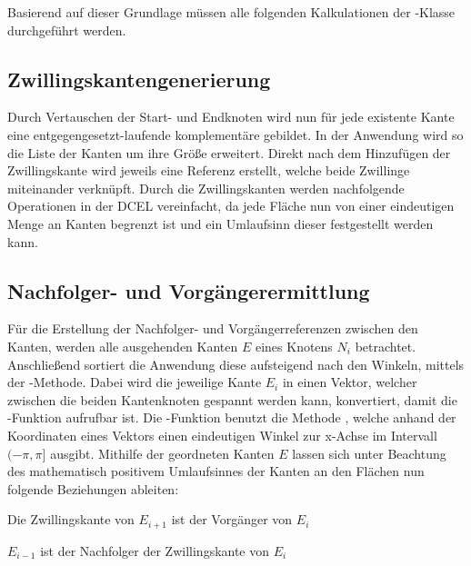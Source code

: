 Basierend auf dieser Grundlage müssen alle folgenden Kalkulationen der -Klasse durchgeführt werden.

\subsection{Zwillingskantengenerierung}
Durch Vertauschen der Start- und Endknoten wird nun für jede existente Kante eine entgegengesetzt-laufende komplementäre  gebildet.
In der Anwendung wird so die Liste der Kanten um ihre Größe erweitert.
Direkt nach dem Hinzufügen der Zwillingskante wird jeweils eine Referenz erstellt, welche beide Zwillinge miteinander verknüpft. 
Durch die Zwillingskanten werden nachfolgende Operationen in der DCEL vereinfacht, da jede Fläche nun von einer eindeutigen Menge an Kanten begrenzt ist und ein Umlaufsinn dieser festgestellt werden kann.

\subsection{Nachfolger- und Vorgängerermittlung}
Für die Erstellung der Nachfolger- und Vorgängerreferenzen zwischen den Kanten, werden alle ausgehenden Kanten $E$ eines Knotens $N_i$ betrachtet.
Anschließend sortiert die Anwendung diese aufsteigend nach den Winkeln, mittels der -Methode.
Dabei wird die jeweilige Kante $E_i$ in einen Vektor, welcher zwischen die beiden Kantenknoten gespannt werden kann, konvertiert, damit die -Funktion aufrufbar ist.
Die -Funktion benutzt die Methode , welche anhand der Koordinaten eines Vektors einen eindeutigen Winkel zur x-Achse im Intervall $(-\pi,\pi]$ ausgibt.
Mithilfe der geordneten Kanten $E$ lassen sich unter Beachtung des mathematisch positivem Umlaufsinnes der Kanten an den Flächen nun folgende Beziehungen ableiten:

\begin{compactenum}
	\item Die Zwillingskante von $E_{i+1}$ ist der Vorgänger von $E_i$
	\item $E_{i-1}$ ist der Nachfolger der Zwillingskante von $E_i$ 
\end{compactenum}

